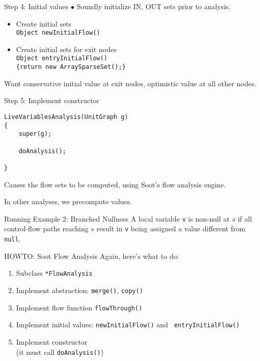 \begin{slide}{Step 4: Initial values}
\vspace*{-0.15in}
$\bullet$ Soundly initialize IN, OUT sets prior to analysis.

\vspace*{-0.1in}
\begin{itemize}
\item Create initial sets\\
{\tt Object newInitialFlow()}\\

\item Create initial sets for exit nodes\\
{\tt Object entryInitialFlow() \\ 
\qquad \{return new ArraySparseSet();\} }

\end{itemize}

Want conservative initial value at exit nodes, optimistic
value at all other nodes.
\end{slide}

\begin{slide}{Step 5: Implement constructor}
\begin{verbatim}
LiveVariablesAnalysis(UnitGraph g)
{
    super(g);

    doAnalysis();
    
}
\end{verbatim}
Causes the flow sets to be computed, using Soot's flow
analysis engine.

\quad

In other analyses, we precompute values.
\end{slide}


\begin{slide}{Running Example 2: Branched Nullness}
\vspace*{-0.2in} 
A local variable {\tt v} is {\red non-null} at $s$ if all
control-flow paths reaching $s$ result in {\tt v} being
assigned a value different from {\tt null}.

\begin{center}

\end{center}
\end{slide}

\begin{slide}{HOWTO: Soot Flow Analysis}
Again, here's what to do:
\begin{enumerate}
\item Subclass \verb+*FlowAnalysis+
\item Implement abstraction: {\tt merge()}, {\tt copy()}
\item Implement flow function {\tt flowThrough()}
\item Implement initial values: {\tt newInitialFlow()} and {\tt
entryInitialFlow()}
\item Implement constructor \\ \quad (it must call {\tt doAnalysis()})
\end{enumerate}
\end{slide}


